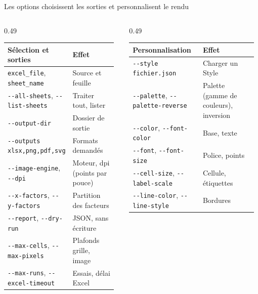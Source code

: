 \begin{frame}[t]{Les options choisissent les sorties et personnalisent le rendu}
\vfill
{\footnotesize\setlength{\tabcolsep}{3pt}
\begin{columns}[T,totalwidth=1.05\textwidth]
\begin{column}{0.49\textwidth}
\begin{tabular}{@{}>{\raggedright\arraybackslash}p{0.54\linewidth}>{\raggedright\arraybackslash}p{0.42\linewidth}@{}}
\toprule
\textbf{Sélection et sorties} & \textbf{Effet}\\
\midrule
\texttt{excel\_file}, \texttt{sheet\_name} & Source et feuille\\
\texttt{-{}-all-sheets}, \texttt{-{}-list-sheets} & Traiter tout, lister\\
\texttt{-{}-output-dir} & Dossier de sortie\\
\texttt{-{}-outputs xlsx,png,pdf,svg} & Formats demandés\\
\texttt{-{}-image-engine}, \texttt{-{}-dpi} & Moteur, dpi (points par pouce)\\
\texttt{-{}-x-factors}, \texttt{-{}-y-factors} & Partition des facteurs\\
\texttt{-{}-report}, \texttt{-{}-dry-run} & JSON, sans écriture\\
\texttt{-{}-max-cells}, \texttt{-{}-max-pixels} & Plafonds grille, image\\
\texttt{-{}-max-runs}, \texttt{-{}-excel-timeout} & Essais, délai Excel\\
\bottomrule
\end{tabular}
\end{column}
\begin{column}{0.49\textwidth}
\begin{tabular}{@{}>{\raggedright\arraybackslash}p{0.54\linewidth}>{\raggedright\arraybackslash}p{0.42\linewidth}@{}}
\toprule
\textbf{Personnalisation} & \textbf{Effet}\\
\midrule
\texttt{-{}-style fichier.json} & Charger un Style\\
\texttt{-{}-palette}, \texttt{-{}-palette-reverse} & Palette (gamme de couleurs), inversion\\
\texttt{-{}-color}, \texttt{-{}-font-color} & Base, texte\\
\texttt{-{}-font}, \texttt{-{}-font-size} & Police, points\\
\texttt{-{}-cell-size}, \texttt{-{}-label-scale} & Cellule, étiquettes\\
\texttt{-{}-line-color}, \texttt{-{}-line-style} & Bordures\\

\end{tabular}
\end{column}
\end{columns}}
\end{frame}
